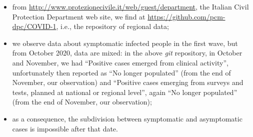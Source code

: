 \documentclass[graybox]{svmult}
\begin{document}
\begin{itemize}

\item from \href{http://www.protezionecivile.it/web/guest/department}{http://www.protezionecivile.it/web/guest/department}, the Italian Civil Protection Department web site, we find at \href{https://github.com/pcm-dpc/COVID-19}{https://github.com/pcm-dpc/COVID-1}, i.e., the repository of regional data; 

\item we observe data about symptomatic infected people in the first wave, but from October 2020, data are mixed: in the above \emph{git} repository, in October and November, we had ``Positive cases emerged from clinical activity'', unfortunately then reported as ``No longer populated'' (from the end of November, our observation) and ``Positive cases emerging from surveys and tests, planned at national or regional level'', again ``No longer populated'' (from the end of November, our observation); 

\item as a consequence, the subdivision between symptomatic and asymptomatic cases is impossible after that date.
\end{itemize}
\end{document}
